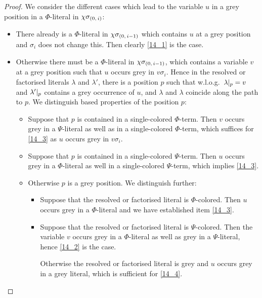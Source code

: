 \documentclass[,%
	draft=false,%
	numbers=noendperiod
	12pt,
	a4paper,
	oneside,%
	openany,
]{memoir}
\newcommand{\inv}{\ensuremath{\chi}}
\begin{document}
\begin{proof}
	We consider the different cases which lead to the variable $u$ in a grey position in a $\Phi$-literal in $\inv\sigmazi$:
	\begin{itemize}
		\item
			There already is a $\Phi$-literal in $\inv\sigmazmi$ which contains $u$ at a grey position and $\sigma_i$ does not change this. Then clearly \ref{14_1} is the case.

		\item
			Otherwise there must be a $\Phi$-literal in $\inv\sigmazmi$, which contains a variable $v$ at a grey position such that $u$ occurs grey in $v\sigma_i$.
			Hence in the resolved or factorised literals $\lambda$ and $\lambda'$, there is a position $p$ such that w.l.o.g.\ $\lambda|_{p} = v$ and $\lambda'|_{p}$ contains a grey occurrence of $u$, and $\lambda$ and $\lambda$ coincide along the path to $p$.
			We distinguish based properties of the position $p$:

			\begin{itemize}
				\item
					Suppose that $p$ is contained in a single-colored $\Phi$-term.
					Then $v$ occurs grey in a $\Psi$-literal as well as in a single-colored $\Phi$-term, which suffices for \ref{14_3} as $u$ occurs grey in $v\sigma_i$.
					

				\item 
					Suppose that $p$ is contained in a single-colored $\Psi$-term.
					Then $u$ occurs grey in a $\Phi$-literal as well in a single-colored $\Psi$-term, which implies \ref{14_3}.

				\item
					Otherwise $p$ is a grey position.
					We distinguish further:

					\begin{itemize}
						\item Suppose that the resolved or factorised literal is $\Phi$-colored.
							Then $u$ occurs grey in a $\Phi$-literal and we have established item \ref{14_3}.

						\item Suppose that the resolved or factorised literal is $\Psi$-colored.
							Then the variable $v$ occurs grey in a $\Phi$-literal as well as grey in a $\Psi$-literal, hence \ref{14_2} is the case.

							Otherwise the resolved or factorised literal is grey and $u$ occurs grey in a grey literal, which is sufficient for \ref{14_4}.
							\qedhere
					\end{itemize}

			\end{itemize}

	\end{itemize}

\end{proof}
\end{document}
